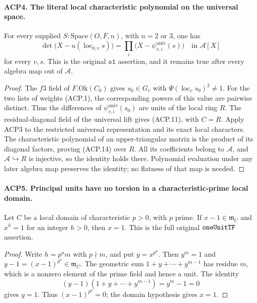 \documentclass[11pt,a4paper]{article}
\numberwithin{equation}{section}
\theoremstyle{remark}\newtheorem{remark}[theorem]{Remark}
\begin{document}
\paragraph{ACP4. The literal local characteristic polynomial on the universal space.}
\label{claim:ACP4}
For every supplied \(S:\mathrm{Space}(O,F,n)\), with
\(n=2\) or \(3\), one has
\[
 \det\bigl(X-u(\operatorname{loc}_{0,v}s)\bigr)
       =\prod_i\bigl(X-\psi^{\mathrm{univ}}_{v,i}(s)\bigr)
                  \quad\text{in }\mathcal A[X]
                                                        \tag{ACP.14}
\]
for every \(v,s\).  This is the original \(\texttt{o1}\)
assertion, and it remains true after every algebra map out of
\(\mathcal A\).

\begin{proof}
The \(f3\) field of \(F.\mathrm{Ok}(C_0)\) gives
\(s_0\in G_v\) with
\(\Psi(\operatorname{loc}_v s_0)^2\ne1\).
For the two lists of weights (ACP.1), the corresponding powers
of this value are pairwise distinct.  Thus the differences of
\(\psi^{\mathrm{univ}}_{v,i}(s_0)\) are units of the local
ring \(R\).  The residual-diagonal field of the universal lift
gives (ACP.11), with \(C=R\).  Apply ACP3 to the restricted
universal representation and its exact local characters.
The characteristic polynomial of an upper-triangular matrix is
the product of its diagonal factors, proving (ACP.14) over \(R\).
All its coefficients belong to \(\mathcal A\), and
\(\mathcal A\hookrightarrow R\) is injective, so the identity
holds there.  Polynomial evaluation under any later algebra map
preserves the identity; no flatness of that map is needed.
\end{proof}

\paragraph{ACP5. Principal units have no torsion in a characteristic-prime local domain.}
\label{claim:ACP5}
Let \(C\) be a local domain of characteristic \(p>0\), with
\(p\) prime.  If \(x-1\in\mathfrak m_C\) and \(x^h=1\)
for an integer \(h>0\), then \(x=1\).
This is the full original \(\texttt{one\allowbreak Unit\allowbreak TF}\) assertion.

\begin{proof}
Write \(h=p^am\) with \(p\nmid m\), and put \(y=x^{p^a}\).
Then \(y^m=1\) and \(y-1=(x-1)^{p^a}\in\mathfrak m_C\).
The geometric sum \(1+y+\cdots+y^{m-1}\) has residue \(m\),
which is a nonzero element of the prime field and hence a unit.
The identity
\[
          (y-1)(1+y+\cdots+y^{m-1})=y^m-1=0
\]
gives \(y=1\).  Thus \((x-1)^{p^a}=0\); the domain
hypothesis gives \(x=1\).
\end{proof}
\end{document}
